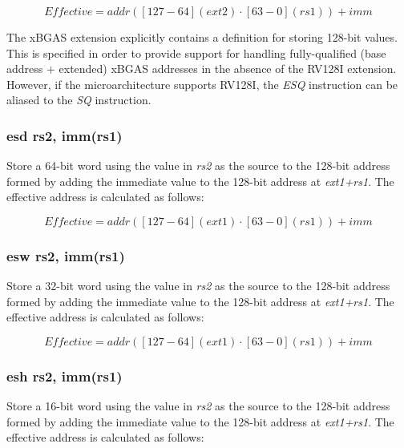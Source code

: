 \documentclass{article}
\begin{document}
\begin{equation}
Effective = addr([127-64](ext2) \cdot [63-0](rs1))+imm
\end{equation}

\begin{commentary}
The xBGAS extension explicitly contains a definition for storing 128-bit values.  
This is specified in order to provide support for handling fully-qualified (base 
address + extended) xBGAS addresses in the absence of the RV128I extension.  However, 
if the microarchitecture supports RV128I, the \textit{ESQ} instruction can be aliased 
to the \textit{SQ} instruction.
\end{commentary}

\subsubsection{esd rs2, imm(rs1)}
Store a 64-bit word using the value in \textit{rs2} as the source 
to the 128-bit address formed by adding the immediate value to the 
128-bit address at \textit{ext1+rs1}.  The effective address is calculated 
as follows: 

\begin{equation}
Effective = addr([127-64](ext1) \cdot [63-0](rs1))+imm
\end{equation}

\subsubsection{esw rs2, imm(rs1)}
Store a 32-bit word using the value in \textit{rs2} as the source 
to the 128-bit address formed by adding the immediate value to the 
128-bit address at \textit{ext1+rs1}.  The effective address is calculated 
as follows: 

\begin{equation}
Effective = addr([127-64](ext1) \cdot [63-0](rs1))+imm
\end{equation}

\subsubsection{esh rs2, imm(rs1)}
Store a 16-bit word using the value in \textit{rs2} as the source 
to the 128-bit address formed by adding the immediate value to the 
128-bit address at \textit{ext1+rs1}.  The effective address is calculated 
as follows: 
\end{document}
